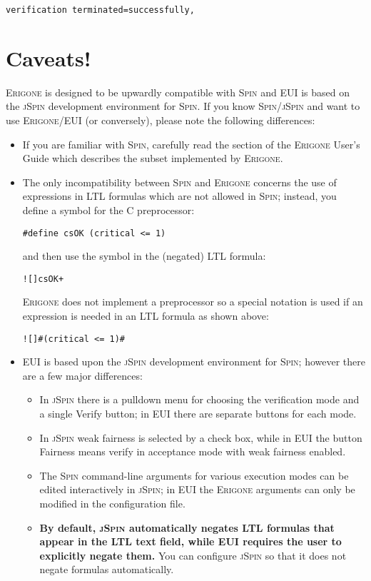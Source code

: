 \documentclass[11pt]{article}
\newcommand*{\prg}{\textsc{Erigone}}
\newcommand*{\eui}{\textsc{EUI}}
\newcommand*{\spn}{\textsc{Spin}}
\newcommand*{\jsp}{\textsc{jSpin}}
\newcommand*{\bu}[1]{\textsf{#1}}
\begin{document}
\begin{verbatim}
verification terminated=successfully,
\end{verbatim}

\section{Caveats!}\label{s.caveat}
\prg{} is designed to be upwardly compatible with \spn{} and \eui{} is
based on the \jsp{} development environment for \spn{}. If you know
\spn{}/\jsp{} and want to use \prg{}/\eui{} (or conversely),
please note the following differences: 
\begin{itemize}

\item If you are familiar with \spn{}, carefully read the section
of the \prg{} User's
Guide which describes the subset implemented by \prg{}.

\item The only incompatibility between \spn{} and \prg{} concerns the
use of expressions in LTL formulas which are not allowed in \spn{};
instead, you define a symbol for the C preprocessor:

\begin{verbatim}
#define csOK (critical <= 1)
\end{verbatim}
and then use the symbol in the (negated) LTL formula:
\begin{verbatim}
![]csOK+
\end{verbatim}
\prg{} does not implement a preprocessor so a
special notation is used if an expression is needed in an LTL formula
as shown above:
\begin{verbatim}
![]#(critical <= 1)#
\end{verbatim}
\item \eui{} is based upon the \jsp{} development environment for
\spn{}; however there are a few major differences:
\begin{itemize}
\item In \jsp{} there
is a pulldown menu for choosing the verification mode and a single
\bu{Verify} button; in \eui{} there are separate buttons for each mode.
\item In \jsp{} weak fairness is selected by a check box, while in
\eui{} the button \bu{Fairness} means verify in
acceptance mode with weak fairness enabled.
\item The \spn{} command-line arguments for various execution modes can
be edited interactively in \jsp{}; in \eui{} the \prg{} arguments can
only be modified in the configuration file.
\item \textbf{By default, \jsp{} automatically negates LTL formulas that
appear in the LTL text field, while \eui{} requires the user to
explicitly negate them.} You can configure \jsp{}
so that it does not negate formulas automatically.
\end{itemize}
\end{itemize}
\end{document}
